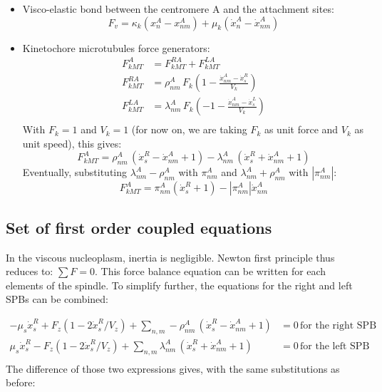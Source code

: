 \documentclass[a4paper,12pt]{article}
\begin{document}
\begin{itemize}
\item Visco-elastic bond between the centromere A and the
  attachment sites:
  $$F_v =  \kappa_k(x_n^A - x_{nm}^A) 
  + \mu_k(\dot{x}_n^A - \dot{x}_{nm}^A) $$
\item Kinetochore microtubules force generators:
  \begin{equation}
    \begin{aligned}
      F_{kMT}^A &= F_{kMT}^{RA} + F_{kMT}^{LA}\\
      F_{kMT}^{RA} &= \rho_{nm}^A\,F_k\left(1 - \frac{\dot{x}^A_{nm} -
          \dot{x}^R_s}{V_k}\right)\\
      F_{kMT}^{LA} &=  \lambda_{nm}^A\,F_k\left(-1 - \frac{\dot{x}^A_{nm} -
          \dot{x}^L_s}{V_k}\right)\\
    \end{aligned}
  \end{equation}
With $F_k = 1$ and $ V_k = 1$ (for now on, we are taking $F_k$ as
unit force and $V_k$ as unit speed), this gives:
\begin{equation}
 F_{kMT}^A = \rho_{nm}^A\,\left(\dot{x}^R_s - \dot{x}^A_{nm} + 1\right)%
 - \lambda_{nm}^A\,\left(\dot{x}^R_s + \dot{x}^A_{nm} + 1\right)
\end{equation}
Eventually, substituting $\lambda^A_{nm} - \rho^A_{nm}$ with $\pi_{nm}^A$ and $\lambda^A_{nm} + \rho^A_{nm}$ with $|\pi_{nm}^A|$:
\begin{equation}
    F_{kMT}^A =  \pi_{nm}^A(\dot{x}^R_s + 1) - |\pi_{nm}^A|\dot{x}^A_{nm}
\end{equation}
\end{itemize}

\subsection{Set of first order coupled equations}

In the viscous nucleoplasm, inertia is negligible. Newton first
principle thus reduces to: $ \sum F = 0 $. This force balance equation
can be written for each elements of the spindle. 
To simplify further, the equations for the right and left SPBs can be
combined:
 
\begin{equation}
  \begin{aligned}
    - \mu_s\dot{x}^R_s + F_{z}\left(1 - 2\dot{x}^R_s/V_z\right)%
    + \sum_{n,m} - \rho_{nm}^A\,\left(\dot{x}^R_s - \dot{x}^A_{nm} +%
      1\right) &= 0 \, \mbox{for the right SPB}\\
    \mu_s\dot{x}^R_s - F_{z}\left(1 - 2\dot{x}^R_s/V_z\right)%
    + \sum_{n,m} \lambda_{nm}^A\,\left(\dot{x}^R_s + \dot{x}^A_{nm} +%
      1\right) &= 0 \, \mbox{for the left SPB}\\
  \end{aligned}
\end{equation}
The difference of those two expressions gives, with the same substitutions as before:
\end{document}
